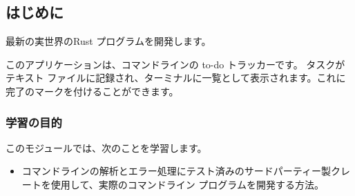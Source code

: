 \subsection{はじめに}

最新の実世界のRust プログラムを開発します。

このアプリケーションは、コマンドラインの to-do トラッカーです。 タスクがテキスト ファイルに記録され、ターミナルに一覧として表示されます。これに完了のマークを付けることができます。

\subsubsection{学習の目的}

このモジュールでは、次のことを学習します。

\begin{itemize}
\item コマンドラインの解析とエラー処理にテスト済みのサードパーティー製クレートを使用して、実際のコマンドライン プログラムを開発する方法。
\end{itemize}